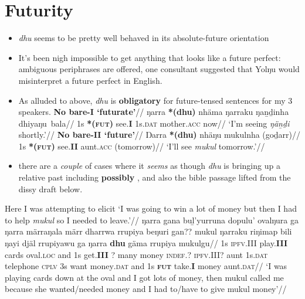 \documentclass[11pt]{article}
\begin{document}
\section{Futurity}
\begin{itemize}
	\item \textit{dhu} seems to be pretty well behaved in its absolute-future orientation
	\item It's been nigh impossible to get anything that looks like a future perfect: ambiguous periphrases are offered, one consultant suggested that Yolŋu would misinterpret a future perfect in English.
	\item As alluded to above, \textit{dhu} is \textbf{obligatory} for future-tensed sentences for my 3 speakers. 
	\pex\a\begingl\glpreamble\textbf{No bare-\textbf{I} `futurate'}//
	\gla ŋarra \textbf{*(dhu)} nhäma ŋarraku ŋaṉḏinha dhiyaŋu~bala//
	\glb 1s \textbf{*(\textsc{fut})} see.\textbf{I} 1s.\textsc{dat} mother.\textsc{acc} now//
	\glft`I'm seeing \textit{ŋäṉḏi} shortly.'\trailingcitation{[BM20190405~22']}//\endgl
	\a\begingl\glpreamble\textbf{No bare-II `future'}//
	\gla Ŋarra \textbf{*(dhu)} nhäŋu mukulnha (goḏarr)//
	\glb 1s \textbf{*({\textsc{fut})}} see.\textbf{II} aunt.\textsc{acc} (tomorrow)//
	\glft`I'll see \textit{mukul} tomorrow.'\trailingcitation{[AW20190409~46']}//\endgl
	\xe

\item there are a \textit{couple} of cases where it \textit{seems} as though \textit{dhu} is bringing up a relative past including \textbf{possibly} \textbf{\nextx}, and also the bible passage lifted from the dissy draft below.
\end{itemize}
\pex\begingl\glpreamble Here I was attempting to elicit `I was going to win a lot of money but then I had to help \textit{mukul} so I needed to leave.'// 
\gla ŋarra gana buḻ'yurruna dopulu' ovalŋura ga ŋarra märraŋala märr dharrwa rrupiya beŋuri gan?? mukul ŋarraku riŋimap bili ŋayi djäl rrupiyawu ga ŋarra \textbf{dhu} gäma rrupiya mukulgu//
\glb 1s \textsc{ipfv.III} play.\textbf{III} cards oval.\textsc{loc} and 1s get.\textbf{III} ? many money \textsc{indef.?} \textsc{ipfv.III?} aunt 1s.\textsc{dat} telephone \textsc{cplv} 3s want money\textsc{.dat} and 1s \textbf{\textsc{fut}} take.\textbf{I} money aunt.\textsc{dat}//
\glft`I was playing cards down at the oval and I got lots of money, then mukul called me because she wanted/needed money and I had to/have to give mukul money'\trailingcitation{[DG20190417]}//\endgl\xe
 
\end{document}
